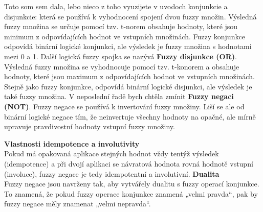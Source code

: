 {\color{red} Toto som sem dala, lebo nieco z toho vyuzijete v uvodoch konjunkcie a disjunkcie: která se používá k vyhodnocení spojení dvou fuzzy množin. Výsledná fuzzy množina se určuje pomocí tzv. t-norem obsahuje hodnoty, které jsou minimum z odpovídajících hodnot ve vstupních množinách. Fuzzy konjunkce odpovídá binární logické konjunkci, ale výsledek je fuzzy množina s hodnotami mezi 0 a 1. Další logická fuzzy spojka se nazývá \textbf{Fuzzy disjunkce (OR)}. Výsledná fuzzy množina se vyhodnocuje pomocí tzv. t-konorem a obsahuje hodnoty, které jsou maximum z odpovídajících hodnot ve vstupních množinách. Stejně jako fuzzy konjunkce, odpovídá binární logické disjunkci, ale výsledek je také fuzzy množina. V neposlední řadě bych chtěla zmínit \textbf{Fuzzy negaci (NOT)}. Fuzzy negace se používá k invertování fuzzy množiny. Liší se ale od binární logické negace tím, že neinvertuje všechny hodnoty na opačné, ale mírně upravuje pravdivostní hodnoty vstupní fuzzy množiny.


\textbf{Vlastnosti idempotence a involutivity} \\
        Pokud má opakovaná aplikace stejných hodnot vždy tentýž výsledek (idempotence) a při dvojí aplikaci se návratová hodnota rovná hodnotě vstupní (involuce), fuzzy negace je tedy idempotentní a involutivní. 
\textbf{Dualita} \\
        Fuzzy negace jsou navrženy tak, aby vytvářely dualitu s fuzzy operací konjunkce. To znamená, že pokud fuzzy operace konjunkce znamená „velmi pravda“, pak by fuzzy negace měly znamenat „velmi nepravda“. }